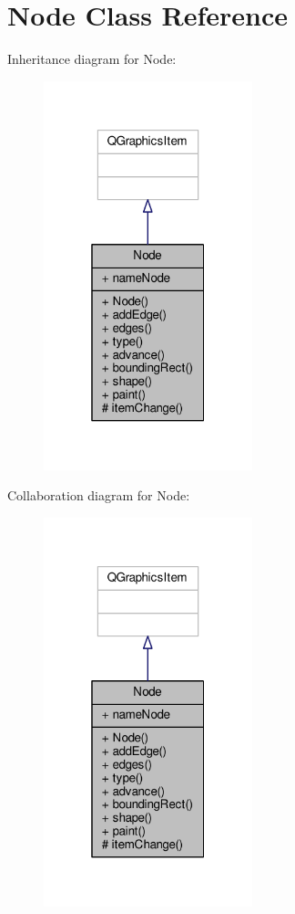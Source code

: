 \hypertarget{classNode}{}\section{Node Class Reference}
\label{classNode}


Inheritance diagram for Node\+:
\nopagebreak
\begin{figure}[H]
\begin{center}
\leavevmode
\includegraphics[width=172pt]{classNode__inherit__graph}
\end{center}
\end{figure}


Collaboration diagram for Node\+:
\nopagebreak
\begin{figure}[H]
\begin{center}
\leavevmode
\includegraphics[width=172pt]{classNode__coll__graph}
\end{center}
\end{figure}

